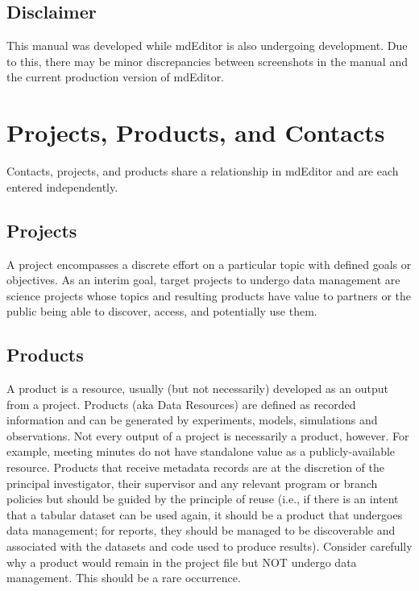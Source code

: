 \documentclass[
]{book}
\begin{document}
\hypertarget{disclaimer}{%
\section*{Disclaimer}\label{disclaimer}}

This manual was developed while mdEditor is also undergoing development. Due to this, there may be minor discrepancies between screenshots in the manual and the current production version of mdEditor.

\mainmatter

\hypertarget{projects-products-and-contacts}{%
\chapter*{Projects, Products, and Contacts}\label{projects-products-and-contacts}}

Contacts, projects, and products share a relationship in mdEditor and are each entered independently.

\hypertarget{projects}{%
\section*{Projects}\label{projects}}

A project encompasses a discrete effort on a particular topic with defined goals or objectives. As an interim goal, target projects to undergo data management are science projects whose topics and resulting products have value to partners or the public being able to discover, access, and potentially use them.

\hypertarget{products}{%
\section*{Products}\label{products}}

A product is a resource, usually (but not necessarily) developed as an output from a project. Products (aka Data Resources) are defined as recorded information and can be generated by experiments, models, simulations and observations. Not every output of a project is necessarily a product, however. For example, meeting minutes do not have standalone value as a publicly-available resource. Products that receive metadata records are at the discretion of the principal investigator, their supervisor and any relevant program or branch policies but should be guided by the principle of reuse (i.e., if there is an intent that a tabular dataset can be used again, it should be a product that undergoes data management; for reports, they should be managed to be discoverable and associated with the datasets and code used to produce results). Consider carefully why a product would remain in the project file but NOT undergo data management. This should be a rare occurrence.
\end{document}
